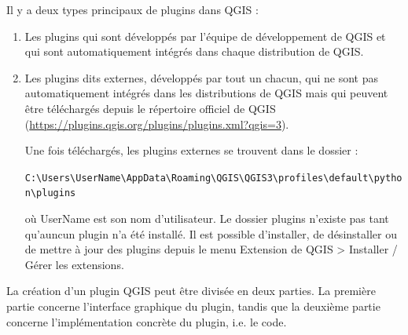 \documentclass[11pt]{article}
\begin{document}
Il y a deux types principaux de plugins dans QGIS :
\begin{enumerate}\itemsep0.4em
\item Les plugins qui sont développés par l'équipe de développement de QGIS et qui sont automatiquement intégrés dans chaque distribution de QGIS. 
\item Les plugins dits \og{}externes\fg{}, développés par tout un chacun, qui ne sont pas automatiquement intégrés dans les distributions de QGIS mais qui peuvent être téléchargés depuis le répertoire officiel de QGIS (\url{https://plugins.qgis.org/plugins/plugins.xml?qgis=3}).

Une fois téléchargés, les plugins externes se trouvent dans le dossier : 

\begin{center}
\texttt{C:\textbackslash{}Users\textbackslash{}\textcolor{mygreen}{UserName}\textbackslash{}AppData\textbackslash{}Roaming\textbackslash{}QGIS\textbackslash{}QGIS3\textbackslash{}profiles\textbackslash{}default\textbackslash{}python\textbackslash{}plugins} 
\end{center}

où \textcolor{mygreen}{UserName} est son nom d'utilisateur. Le dossier \og{}plugins\fg{} n'existe pas tant qu'auncun plugin n'a été installé. Il est possible d'installer, de désinstaller ou de mettre à jour des plugins depuis le menu \og{}Extension\fg{} de QGIS >{} \og{}Installer / Gérer les extensions\fg{}. 
\end{enumerate} 



La création d'un plugin QGIS peut être divisée en deux parties. La première partie concerne l'interface graphique du plugin, tandis que la deuxième partie concerne l'implémentation concrète du plugin, i.e. le code. 
\end{document}
